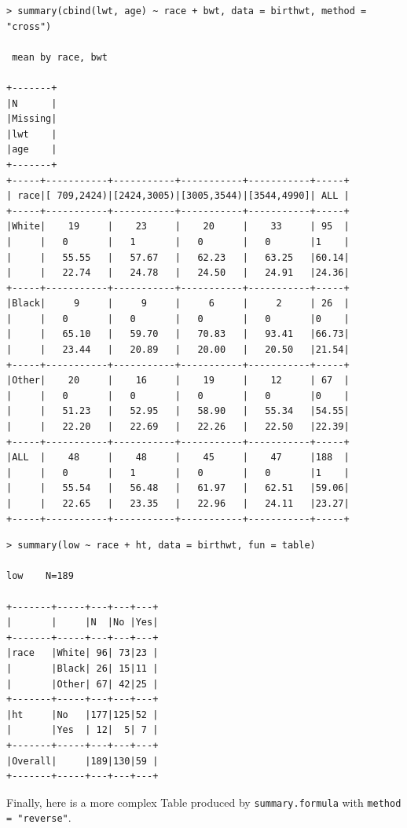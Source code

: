 \documentclass[a4paper,twoside]{book}
\renewcommand{\texttt}[1]{\lstinline{#1}}
\begin{document}
\begin{verbatim}
> summary(cbind(lwt, age) ~ race + bwt, data = birthwt, method = "cross")

 mean by race, bwt 

+-------+
|N      |
|Missing|
|lwt    |
|age    |
+-------+
+-----+-----------+-----------+-----------+-----------+-----+
| race|[ 709,2424)|[2424,3005)|[3005,3544)|[3544,4990]| ALL |
+-----+-----------+-----------+-----------+-----------+-----+
|White|    19     |    23     |    20     |    33     | 95  |
|     |   0       |   1       |   0       |   0       |1    |
|     |   55.55   |   57.67   |   62.23   |   63.25   |60.14|
|     |   22.74   |   24.78   |   24.50   |   24.91   |24.36|
+-----+-----------+-----------+-----------+-----------+-----+
|Black|     9     |     9     |     6     |     2     | 26  |
|     |   0       |   0       |   0       |   0       |0    |
|     |   65.10   |   59.70   |   70.83   |   93.41   |66.73|
|     |   23.44   |   20.89   |   20.00   |   20.50   |21.54|
+-----+-----------+-----------+-----------+-----------+-----+
|Other|    20     |    16     |    19     |    12     | 67  |
|     |   0       |   0       |   0       |   0       |0    |
|     |   51.23   |   52.95   |   58.90   |   55.34   |54.55|
|     |   22.20   |   22.69   |   22.26   |   22.50   |22.39|
+-----+-----------+-----------+-----------+-----------+-----+
|ALL  |    48     |    48     |    45     |    47     |188  |
|     |   0       |   1       |   0       |   0       |1    |
|     |   55.54   |   56.48   |   61.97   |   62.51   |59.06|
|     |   22.65   |   23.35   |   22.96   |   24.11   |23.27|
+-----+-----------+-----------+-----------+-----------+-----+
\end{verbatim}

\begin{verbatim}
> summary(low ~ race + ht, data = birthwt, fun = table)

low    N=189

+-------+-----+---+---+---+
|       |     |N  |No |Yes|
+-------+-----+---+---+---+
|race   |White| 96| 73|23 |
|       |Black| 26| 15|11 |
|       |Other| 67| 42|25 |
+-------+-----+---+---+---+
|ht     |No   |177|125|52 |
|       |Yes  | 12|  5| 7 |
+-------+-----+---+---+---+
|Overall|     |189|130|59 |
+-------+-----+---+---+---+
\end{verbatim}

Finally, here is a more complex Table produced by \texttt{summary.formula}
with \texttt{method = "reverse"}.
\end{document}
